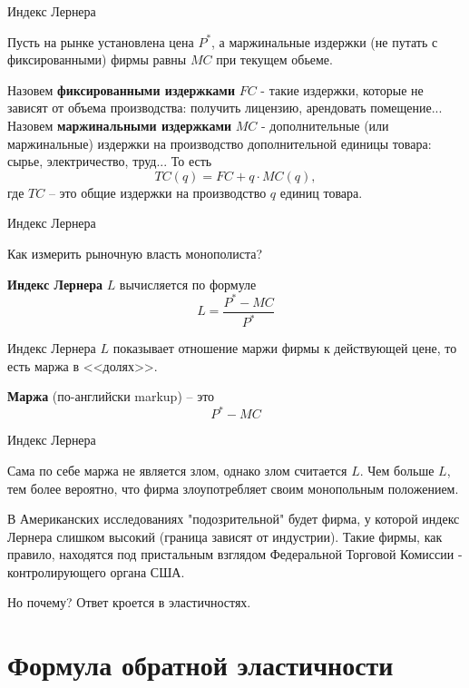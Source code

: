 \documentclass{beamer}
\begin{document}
\begin{frame}{Индекс Лернера}

Пусть на рынке установлена цена $P^{\ast}$, а маржинальные издержки (не путать с фиксированными) фирмы равны $MC$ при текущем обьеме.

Назовем \textbf{фиксированными издержками} $FC$ - такие издержки, которые не зависят от объема производства: получить лицензию, арендовать помещение... Назовем \textbf{маржинальными издержками} $MC$ - дополнительные (или маржинальные) издержки на производство дополнительной единицы товара: сырье, электричество, труд... То есть
$$ TC(q) = FC + q \cdot MC(q),$$
где $TC$ – это общие издержки на производство $q$ единиц товара.
\end{frame}

\begin{frame}{Индекс Лернера}

Как измерить рыночную власть монополиста?

\begin{definition}
\textbf{Индекс Лернера} $L$ вычисляется по формуле
$$L = \frac{P^{\ast}-MC}{P^{\ast}}$$
\end{definition}
Индекс Лернера $L$ показывает отношение маржи фирмы к действующей цене, то есть маржа в <<долях>>.

\begin{definition}
\textbf{Маржа} (по-английски markup) – это 
$$P^{\ast}-MC$$
\end{definition}

\end{frame}

\begin{frame}{Индекс Лернера}

Сама по себе маржа не является злом, однако злом считается $L$. Чем больше $L$, тем более вероятно, что фирма злоупотребляет своим монопольным положением.

В Американских исследованиях "подозрительной" будет фирма, у которой индекс Лернера слишком высокий (граница зависят от индустрии). Такие фирмы, как правило, находятся под пристальным взглядом Федеральной Торговой Комиссии - контролирующего органа США. 

Но почему? Ответ кроется в эластичностях.

\end{frame}

\section{Формула обратной эластичности}
\end{document}
